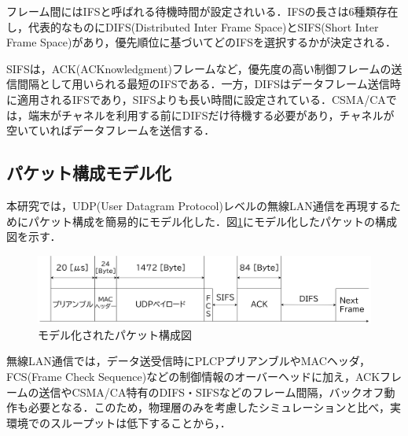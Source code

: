 \documentclass[a4paper, 10pt]{ltjsarticle}
\begin{document}
フレーム間にはIFSと呼ばれる待機時間が設定されいる．IFSの長さは6種類存在し，代表的なものにDIFS(Distributed Inter Frame Space)とSIFS(Short Inter Frame Space)があり，優先順位に基づいてどのIFSを選択するかが決定される．

SIFSは，ACK(ACKnowledgment)フレームなど，優先度の高い制御フレームの送信間隔として用いられる最短のIFSである．一方，DIFSはデータフレーム送信時に適用されるIFSであり，SIFSよりも長い時間に設定されている．CSMA/CAでは，端末がチャネルを利用する前にDIFSだけ待機する必要があり，チャネルが空いていればデータフレームを送信する．


\subsection{パケット構成モデル化}

本研究では，UDP(User Datagram Protocol)レベルの無線LAN通信を再現するためにパケット構成を簡易的にモデル化した．図\ref{packet}にモデル化したパケットの構成図を示す．



\begin{figure}[H]
  \centering
  \includegraphics[width=1\columnwidth]{./assets/packet.png}
  \caption{モデル化されたパケット構成図}
  \label{packet}
\end{figure}

無線LAN通信では，データ送受信時にPLCPプリアンブルやMACヘッダ，FCS(Frame Check Sequence)などの制御情報のオーバーヘッドに加え，ACKフレームの送信やCSMA/CA特有のDIFS・SIFSなどのフレーム間隔，バックオフ動作も必要となる．このため，物理層のみを考慮したシミュレーションと比べ，実環境でのスループットは低下することから，．


\end{document}
